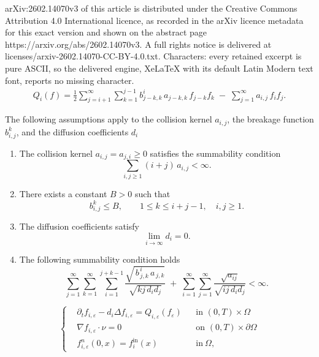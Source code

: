 \documentclass[10pt,a4paper]{amsart}
\begin{document}
arXiv:2602.14070v3 of this article is distributed under the Creative Commons Attribution 4.0 International licence, as recorded in the arXiv licence metadata for this exact version and shown on the abstract page https://arxiv.org/abs/2602.14070v3. A full rights notice is delivered at licenses/arxiv-2602.14070-CC-BY-4.0.txt. Characters: every retained excerpt is pure ASCII, so the delivered engine, XeLaTeX with its default Latin Modern text font, reports no missing character.
	\begin{align} 
		Q_i(f)
		= 
		\frac12 \sum_{j=i+1}^{\infty}\sum_{k=1}^{j-1}
		b_{j-k,k}^i\, a_{j-k,k}\, f_{j-k} f_k
		\;-\;
		\sum_{j=1}^{\infty} a_{i,j}\, f_i f_j. \label{NFE Operator}
	\end{align}

	\begin{assum}\label{strong assumption}
		The following assumptions apply to the collision kernel $a_{i,j}$, the
		breakage function $b_{i,j}^k$, and the diffusion coefficients $d_i$
		
		\begin{enumerate}
			\item[(A1)] The collision kernel $a_{i,j}=a_{j,i}\ge0$ satisfies the summability condition
			\[
			\sum_{i,j \ge 1} (i+j)\, a_{i,j} < \infty.
			\]
			
			\item[(A2)] There exists a constant $B > 0$ such that
			\[
			b_{i,j}^k \le B, \qquad 1 \le k \le i+j-1, \quad i,j \ge 1.
			\]
			
			\item[(A3)] The diffusion coefficients satisfy
			\[
			\lim_{i \to \infty} d_i = 0.
			\]
			
			\item[(A4)] The following summability condition holds
			\[
			\sum_{j=1}^{\infty}
			\sum_{k=1}^{\infty}
			\sum_{i=1}^{j+k-1}
			\frac{\sqrt{\, b^{\,i}_{\,j,k}\, a_{\,j,k}}}{\sqrt{k j\, d_i d_j}}
			\;+\;
			\sum_{i=1}^{\infty}\sum_{j=1}^{\infty}
			\frac{\sqrt{a_{i j}}}{\sqrt{i j\, d_i d_j}}
			< \infty.
			\]
		\end{enumerate}
	\end{assum}

		\begin{equation}
			\label{eq:RNFE}
			\left\{
			\begin{aligned}
				& \partial_t f_{i,\varepsilon} - d_i \Delta f_{i,\varepsilon}
				= Q_{i,\varepsilon}(f_{\varepsilon})
				&& \text{in } (0,T)\times\Omega \\
				& \nabla f_{i,\varepsilon} \cdot \nu = 0
				&& \text{on } (0,T)\times\partial\Omega \\
				& f_{i,\varepsilon}^n(0,x) = f_i^{\mathrm{in}}(x)
				&& \text{in}\ \Omega,
			\end{aligned}
			\right.
		\end{equation}
\end{document}

